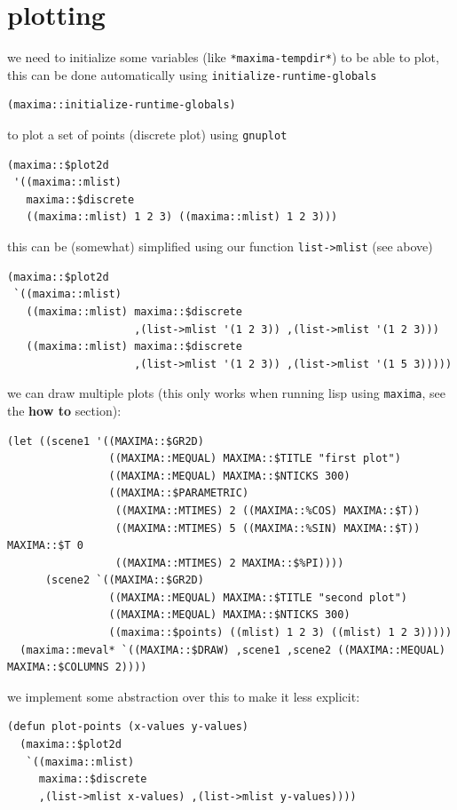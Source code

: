 \documentclass[a4paper,12pt]{article}
\begin{document}
\section{plotting}
\label{sec:org91fff8f}
we need to initialize some variables (like \texttt{*maxima-tempdir*}) to be able to plot, this can be done automatically using \texttt{initialize-runtime-globals}\\
\lstset{language=Lisp,label= ,caption= ,captionpos=b,numbers=none}
\begin{lstlisting}
(maxima::initialize-runtime-globals)
\end{lstlisting}
to plot a set of points (discrete plot) using \texttt{gnuplot}\\
\lstset{language=Lisp,label= ,caption= ,captionpos=b,numbers=none}
\begin{lstlisting}
(maxima::$plot2d
 '((maxima::mlist)
   maxima::$discrete
   ((maxima::mlist) 1 2 3) ((maxima::mlist) 1 2 3)))
\end{lstlisting}
this can be (somewhat) simplified using our function \texttt{list->mlist} (see above)\\
\lstset{language=Lisp,label= ,caption= ,captionpos=b,numbers=none}
\begin{lstlisting}
(maxima::$plot2d
 `((maxima::mlist)
   ((maxima::mlist) maxima::$discrete
                    ,(list->mlist '(1 2 3)) ,(list->mlist '(1 2 3)))
   ((maxima::mlist) maxima::$discrete
                    ,(list->mlist '(1 2 3)) ,(list->mlist '(1 5 3)))))
\end{lstlisting}
we can draw multiple plots (this only works when running lisp using \texttt{maxima}, see the \textbf{how to} section):\\
\lstset{language=Lisp,label= ,caption= ,captionpos=b,numbers=none}
\begin{lstlisting}
(let ((scene1 '((MAXIMA::$GR2D)
                ((MAXIMA::MEQUAL) MAXIMA::$TITLE "first plot")
                ((MAXIMA::MEQUAL) MAXIMA::$NTICKS 300)
                ((MAXIMA::$PARAMETRIC)
                 ((MAXIMA::MTIMES) 2 ((MAXIMA::%COS) MAXIMA::$T))
                 ((MAXIMA::MTIMES) 5 ((MAXIMA::%SIN) MAXIMA::$T)) MAXIMA::$T 0
                 ((MAXIMA::MTIMES) 2 MAXIMA::$%PI))))
      (scene2 `((MAXIMA::$GR2D)
                ((MAXIMA::MEQUAL) MAXIMA::$TITLE "second plot")
                ((MAXIMA::MEQUAL) MAXIMA::$NTICKS 300)
                ((maxima::$points) ((mlist) 1 2 3) ((mlist) 1 2 3)))))
  (maxima::meval* `((MAXIMA::$DRAW) ,scene1 ,scene2 ((MAXIMA::MEQUAL) MAXIMA::$COLUMNS 2))))
\end{lstlisting}
we implement some abstraction over this to make it less explicit:\\
\lstset{language=Lisp,label= ,caption= ,captionpos=b,numbers=none}
\begin{lstlisting}
(defun plot-points (x-values y-values)
  (maxima::$plot2d
   `((maxima::mlist)
     maxima::$discrete
     ,(list->mlist x-values) ,(list->mlist y-values))))
\end{lstlisting}
\end{document}
